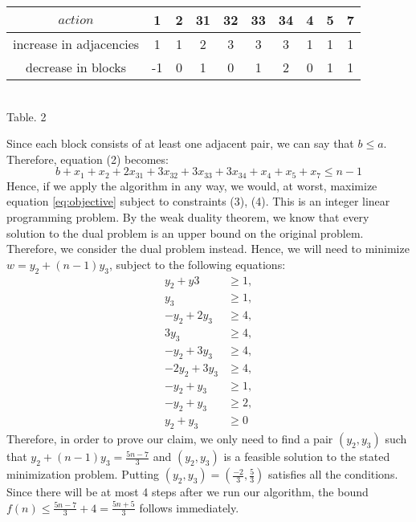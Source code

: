 \begin{center}
\begin{tabular}{ |c c c c c c c c c c| } 
 \hline
 $action$ & 1 & 2 & 31 & 32 & 33 & 34 & 4 & 5 & 7 \\
 \hline
 increase in adjacencies & 1 & 1 & 2 & 3 & 3 & 3 & 1 & 1 & 1 \\
 \hline
 decrease in blocks      & -1 & 0 & 1 & 0 & 1 & 2 & 0 & 1 & 1 \\
 \hline
\end{tabular}\\
Table. 2 
\end{center}
Since each block consists of at least one adjacent pair, we can say that $b \leq a$. Therefore, equation (2) becomes: 
\begin{equation}
b + x_1 + x_2 + 2x_{31} + 3x_{32} + 3x_{33} + 3x_{34} + x_4 + x_5 + x_7 \leq n - 1
\end{equation}
Hence, if we apply the algorithm in any way\footnotemark{}, we would, at worst, maximize equation \eqref{eq:objective} subject to constraints (3), (4).
This is an integer linear programming problem. By the weak duality theorem, we know that every solution to the dual problem is an upper bound on the original problem. Therefore, we consider the dual problem instead. Hence, we will need to minimize $ w = y_2 + (n-1)y_3 $, subject to the following equations: 
\begin{align}
y_2 + y3 &\geq 1, \\ 
y_3 &\geq 1,\\ 
-y_2 + 2y_3 &\geq 4, \\
3y_3 &\geq 4, \\ 
-y_2 + 3y_3 &\geq 4, \\ 
-2y_2 + 3y_3 &\geq 4, \\ 
-y_2 + y_3 &\geq 1, \\ 
-y_2 + y_3 &\geq 2, \\
y_2 + y_3 &\geq 0 
\end{align} 
Therefore, in order to prove our claim, we only need to find a pair $(y_2, y_3)$ such that $y_2 + (n-1)y_3 = \frac{5n-7}{3} $ and $(y_2, y_3)$ is a feasible solution to the stated minimization problem. Putting $(y_2, y_3)=(\frac{-2}{3},\frac{5}{3})$ satisfies all the conditions. Since there will be at most 4 steps after we run our algorithm, the bound $f(n) \leq \frac{5n-7}{3} + 4 = \frac{5n+5}{3}$ follows immediately. 

